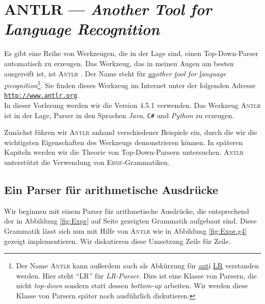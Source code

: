 \chapter[ANTLR]{ANTLR --- \emph{Another Tool for Language Recognition}}
Es gibt eine Reihe von Werkzeugen, die in der Lage sind, einen Top-Down-Parser automatisch
zu erzeugen.  Das Werkzeug, das in meinen Augen am besten ausgereift ist, ist
\textsc{Antlr} \cite{parr:2012,parr:2013}.  Der Name steht f\"ur 
\emph{\underline{an}other \underline{t}ool for \underline{l}anguage \underline{r}ecognition}\footnote{
Der Name \textsc{Antlr} kann au{\ss}erdem auch als Abk\"urzung f\"ur \underline{ant}i \underline{LR} verstanden
werden. Hier steht ``LR'' f\"ur \emph{LR-Parser}.  Dies ist eine Klasse von Parsern, die nicht \emph{top-down} 
sondern statt dessen \emph{bottom-up} arbeiten.  Wir werden diese Klasse von Parsern sp\"ater noch ausf\"uhrlich 
diskutieren.
}.
Sie finden dieses Werkzeug im Internet unter der folgenden Adresse 
\\[0.2cm]
\hspace*{1.3cm}
\href{http://www.antlr.org}{\texttt{http://www.antlr.org}}.
\\[0.2cm]
In dieser Vorlesung werden wir die Version 4.5.1 verwenden.  Das Werkzeug \textsc{Antlr} ist in der
Lage, Parser in den Sprachen \textsl{Java}, \texttt{C\#} und \textsl{Python} zu erzeugen.

Zun\"achst f\"uhren wir \textsc{Antlr} anhand verschiedener Beispiele ein, durch die wir die 
wichtigsten Eigenschaften des Werkzeugs demonstrieren k\"onnen.  In sp\"ateren Kapiteln werden wir
die Theorie von Top-Down-Parsern untersuchen.
\textsc{Antlr} unterst\"utzt die Verwendung von \textsc{Ebnf}-Grammatiken.  


\section{Ein Parser f\"ur arithmetische Ausdr\"ucke}
Wir beginnen mit einem Parser f\"ur arithmetische Ausdr\"ucke, die entsprechend der in
Abbildung \ref{fig:Expr} auf Seite \pageref{fig:Expr} gezeigten Grammatik aufgebaut sind.
Diese Grammatik l\"asst sich nun mit Hilfe von \textsc{Antlr} wie in Abbildung
\ref{fig:Expr.g4} gezeigt implementieren.  Wir diskutieren diese Umsetzung Zeile f\"ur Zeile.

